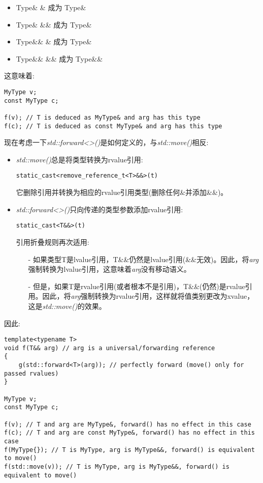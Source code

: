 \begin{itemize}
	\item Type\& \& 成为 Type\&
	\item Type\& \&\& 成为 Type\&
	\item Type\&\& \& 成为 Type\&
	\item Type\&\& \&\& 成为 Type\&\&
\end{itemize}

这意味着:\par

\begin{lstlisting}[caption={}]
MyType v;
const MyType c;

f(v); // T is deduced as MyType& and arg has this type
f(c); // T is deduced as const MyType& and arg has this type
\end{lstlisting}

现在考虑一下\textit{std::forward<>()}是如何定义的，与\textit{std::move()}相反:\par

\begin{itemize}
	\item \textit{std::move()}总是将类型转换为rvalue引用:
	\begin{lstlisting}[caption={}]
	static_cast<remove_reference_t<T>&&>(t)
	\end{lstlisting}
	它删除引用并转换为相应的rvalue引用类型(删除任何\&并添加\&\&)。
	\item \textit{std::forward<>()}只向传递的类型参数添加rvalue引用:
	\begin{lstlisting}[caption={}]
	static_cast<T&&>(t)
	\end{lstlisting}
	引用折叠规则再次适用:
	\begin{itemize}
		\item[-] 如果类型T是lvalue引用，T\&\&仍然是lvalue引用(\&\&无效)。因此，将\textit{arg}强制转换为lvalue引用，这意味着\textit{arg}没有移动语义。
		\item[-] 但是，如果T是rvalue引用(或者根本不是引用)，T\&\&(仍然)是rvalue引用。因此，将\textit{arg}强制转换为rvalue引用，这样就将值类别更改为xvalue，这是\textit{std::move()}的效果。
	\end{itemize}
\end{itemize}

因此:\par

\begin{lstlisting}[caption={}]
template<typename T>
void f(T&& arg) // arg is a universal/forwarding reference
{
	g(std::forward<T>(arg)); // perfectly forward (move() only for passed rvalues)
}

MyType v;
const MyType c;

f(v); // T and arg are MyType&, forward() has no effect in this case
f(c); // T and arg are const MyType&, forward() has no effect in this case
f(MyType{}); // T is MyType, arg is MyType&&, forward() is equivalent to move()
f(std::move(v)); // T is MyType, arg is MyType&&, forward() is equivalent to move()
\end{lstlisting}

